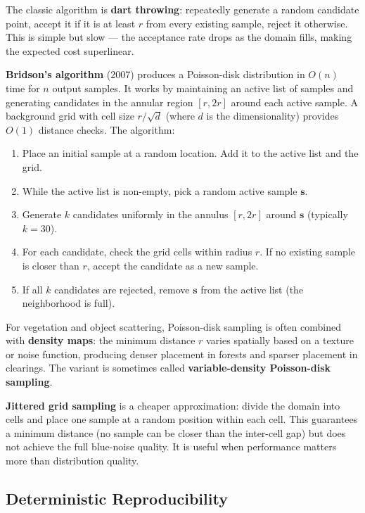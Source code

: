 \documentclass[
  11pt,
  letterpaper,
  DIV=11,
  numbers=noendperiod,
  twoside,
  open=right]{scrreprt}
\providecommand{\tightlist}{%
  \setlength{\itemsep}{0pt}\setlength{\parskip}{0pt}}
\begin{document}
The classic algorithm is \textbf{dart throwing}: repeatedly generate a
random candidate point, accept it if it is at least \(r\) from every
existing sample, reject it otherwise. This is simple but slow --- the
acceptance rate drops as the domain fills, making the expected cost
superlinear.

\textbf{Bridson's algorithm} (2007) produces a Poisson-disk distribution
in \(O(n)\) time for \(n\) output samples. It works by maintaining an
active list of samples and generating candidates in the annular region
\([r, 2r]\) around each active sample. A background grid with cell size
\(r / \sqrt{d}\) (where \(d\) is the dimensionality) provides \(O(1)\)
distance checks. The algorithm:

\begin{enumerate}
\def\labelenumi{\arabic{enumi}.}
\tightlist
\item
  Place an initial sample at a random location. Add it to the active
  list and the grid.
\item
  While the active list is non-empty, pick a random active sample
  \(\mathbf{s}\).
\item
  Generate \(k\) candidates uniformly in the annulus \([r, 2r]\) around
  \(\mathbf{s}\) (typically \(k = 30\)).
\item
  For each candidate, check the grid cells within radius \(r\). If no
  existing sample is closer than \(r\), accept the candidate as a new
  sample.
\item
  If all \(k\) candidates are rejected, remove \(\mathbf{s}\) from the
  active list (the neighborhood is full).
\end{enumerate}

For vegetation and object scattering, Poisson-disk sampling is often
combined with \textbf{density maps}: the minimum distance \(r\) varies
spatially based on a texture or noise function, producing denser
placement in forests and sparser placement in clearings. The variant is
sometimes called \textbf{variable-density Poisson-disk sampling}.

\textbf{Jittered grid sampling} is a cheaper approximation: divide the
domain into cells and place one sample at a random position within each
cell. This guarantees a minimum distance (no sample can be closer than
the inter-cell gap) but does not achieve the full blue-noise quality. It
is useful when performance matters more than distribution quality.

\subsection{Deterministic
Reproducibility}\label{deterministic-reproducibility}
\end{document}
